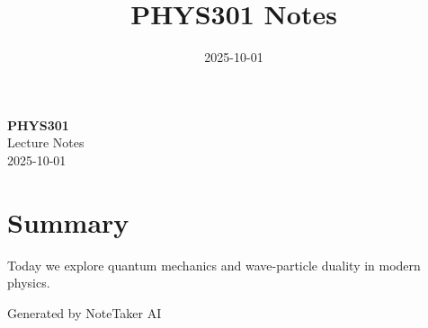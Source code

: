 \documentclass[11pt,a4paper]{article}
\title{\textcolor{primarycolor}{\Huge\textbf{PHYS301 Notes}}}
\author{}
\date{\textcolor{secondarycolor}{2025-10-01}}
\begin{document}
\begin{tcolorbox}[
    colback=secondarycolor!10,
    colframe=primarycolor,
    width=\textwidth,
    arc=4mm,
    boxrule=2pt
]
    \begin{center}
        {\Huge\textcolor{primarycolor}{\textbf{PHYS301}}} \\[0.5cm]
        {\Large Lecture Notes} \\[0.3cm]
        {\large\textcolor{secondarycolor}{2025-10-01}}
    \end{center}
\end{tcolorbox}

\vspace{1cm}

\section*{\textcolor{primarycolor}{Summary}}
Today we explore quantum mechanics and wave-particle duality in modern physics.

\vspace{1cm}

\begin{center}
\textcolor{secondarycolor}{\small Generated by NoteTaker AI}
\end{center}
\end{document}
